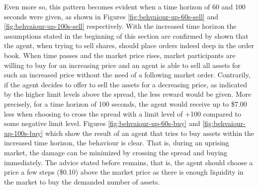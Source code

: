 Even more so, this pattern becomes evident when a time horizon of 60 and 100 seconds were given, as shown in Figures \ref{fig:behvaiour-up-60s-sell} and \ref{fig:behvaiour-up-100s-sell} respectively.
With the increased time horizon the assumptions stated in the beginning of this section are confirmed by shown that the agent, when trying to sell shares, should place orders indeed deep in the order book.
When time passes and the market price rises, market participants are willing to buy for an increasing price and an agent is able to sell all assets for such an increased price without the need of a following market order.
Contrarily, if the agent decides to offer to sell the assets for a decreasing price, as indicated by the higher limit levels above the spread, the less reward would be given.
More precisely, for a time horizon of 100 seconds, the agent would receive up to \$7.00 less when choosing to cross the spread with a limit level of +100 compared to some negative limit level.
Figures \ref{fig:behvaiour-up-60s-buy} and \ref{fig:behvaiour-up-100s-buy} which show the result of an agent that tries to buy assets within the increased time horizon, the behaviour is clear.
That is, during an uprising market, the damage can be minimized by crossing the spread and buying immediately.
The advice stated before remains, that is, the agent should choose a price a few steps (\$0.10) above the market price as there is enough liquidity in the market to buy the demanded number of assets.
\vfill
\newpage
